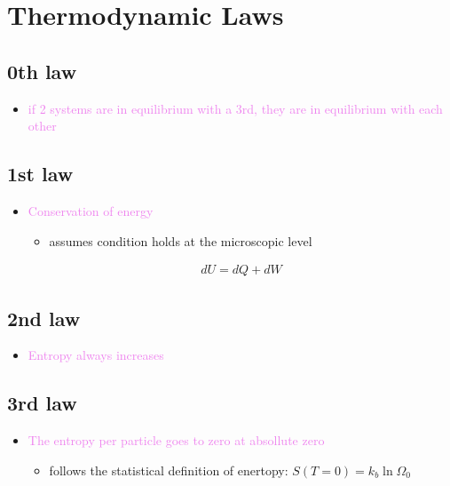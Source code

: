 

\section{Thermodynamic Laws}

\subsection*{0th law}
\begin{itemize}
    \item \textcolor{violet}{if 2 systems are in equilibrium with a 3rd, they are in equilibrium
    with each other}
\end{itemize}


\subsection*{1st law}
\begin{itemize}
    \item \textcolor{violet}{Conservation of energy}
    \begin{itemize}
        \item assumes condition holds at the microscopic level
    \end{itemize}
    \begin{align}
        dU = dQ + dW
    \end{align}
\end{itemize}


\subsection*{2nd law}
\begin{itemize}
    \item \textcolor{violet}{Entropy always increases}
\end{itemize}


\subsection*{3rd law}
\begin{itemize}
    \item \textcolor{violet}{The entropy per particle goes to zero at absollute zero}
    \begin{itemize}
        \item follows the statistical definition of enertopy: $S(T = 0) = k_b \ln \Omega_0$
    \end{itemize}
\end{itemize}
